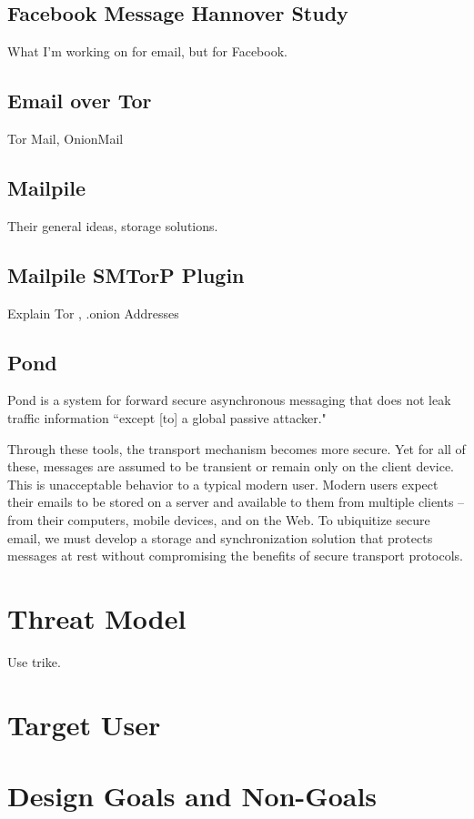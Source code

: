 \documentclass[pageno]{jpaper}
\begin{document}
\subsection{Facebook Message Hannover Study}
What I'm working on for email, but for Facebook. \cite{fahl}

\subsection{Email over Tor}
Tor Mail, OnionMail

\subsection{Mailpile}
Their general ideas, storage solutions. \cite{mailpile}

\subsection{Mailpile SMTorP Plugin}
Explain Tor \cite{tor}, .onion Addresses \cite{smtorp}

\subsection{Pond}
Pond is a system for forward secure asynchronous messaging that does not leak traffic information ``except [to] a global passive attacker." \cite{pond}

Through these tools, the transport mechanism becomes more secure. Yet for all of these, messages are assumed to be transient or remain only on the client device. This is unacceptable behavior to a typical modern user. Modern users expect their emails to be stored on a server and available to them from multiple clients -- from their computers, mobile devices, and on the Web. To ubiquitize secure email, we must develop a storage and synchronization solution that protects messages at rest without compromising the benefits of secure transport protocols.

\section{Threat Model}
Use trike.

\section{Target User}
\label{targetuser}

\section{Design Goals and Non-Goals}
\label{goals}
\end{document}
